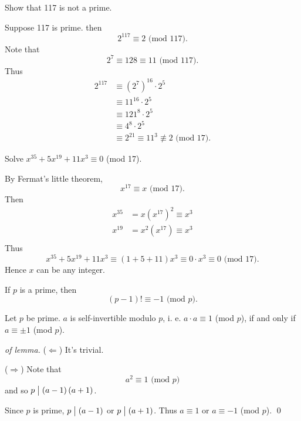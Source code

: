 \begin{example}
    Show that 117 is not a prime.

    Suppose 117 is prime. then
    \[
        2^{117} \equiv 2 \mbox{ (mod 117)}.    
    \]
    Note that
    \[
        2^7 \equiv 128 \equiv 11 \mbox{ (mod 117)}.    
    \]
    Thus
    \begin{align*}
        2^{117} &\equiv \left(2^7\right)^{16} \cdot 2^5 \\
        &\equiv 11^{16} \cdot 2^5 \\
        &\equiv 121^8 \cdot 2^5 \\
        &\equiv 4^8 \cdot 2^5 \\
        &\equiv 2^{21} \equiv 11^3 \not\equiv 2 \mbox{ (mod 17)}.
    \end{align*}
\end{example}

\begin{example}
    Solve $x^{35}+5x^{19}+11x^3 \equiv 0$ (mod 17).

    By Fermat's little theorem,
    \[
        x^{17} \equiv x \mbox{ (mod 17)}.   
    \]
    Then
    \begin{align*}
        x^{35} &= x\left(x^{17}\right)^2 \equiv x^3 \\
        x^{19} &= x^2\left(x^{17}\right) \equiv x^3 \\
    \end{align*}
    Thus
    \[
        x^{35}+5x^{19}+11x^3 \equiv \left(1+5+11\right)x^3 \equiv 0\cdot x^3 \equiv 0
        \mbox{ (mod 17)}.
    \]
    Hence $x$ can be any integer.
\end{example}

\begin{theorem}
    If $p$ is a prime, then
    \[
        \left(p-1\right)! \equiv -1 \mbox{ (mod $p$)}.
    \]
\end{theorem}

\begin{lemma}
    Let $p$ be prime. $a$ is self-invertible modulo $p$,
    i. e. $a\cdot a \equiv 1$ (mod $p$), if and only if $a \equiv \pm 1$ (mod $p$).
\end{lemma}

\begin{proof}[of lemma]
    ($\Leftarrow$) It's trivial.

    ($\Rightarrow$) Note that
    \[
        a^2 \equiv 1 \mbox{ (mod $p$)}
    \]
    and so $p \bigm| \left(a-1\right)\left(a+1\right)$.

    Since $p$ is prime, $p \bigm| \left(a-1\right)$ or $p \bigm| \left(a+1\right)$.
    Thus $a \equiv 1$ or $a \equiv -1$ (mod $p$). \qed
\end{proof}

